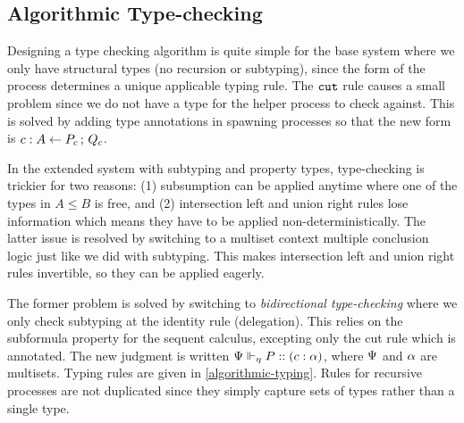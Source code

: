 \documentclass[submission,copyright,creativecommons]{eptcs}
\begin{document}
\subsection{Algorithmic Type-checking}

Designing a type checking algorithm is quite simple for the base system where we only have structural types (no recursion or subtyping), since the form of the process determines a unique applicable typing rule. The $\cut$ rule causes a small problem since we do not have a type for the helper process to check against. This is solved by adding type annotations in spawning processes so that the new form is $\tspawnType c {P_c} A {Q_c}$.

In the extended system with subtyping and property types, type-checking is trickier for two reasons: (1) subsumption can be applied anytime where one of the types in $A \le B$ is free, and (2) intersection left and union right rules lose information which means they have to be applied non-deterministically. The latter issue is resolved by switching to a multiset context multiple conclusion logic just like we did with subtyping. This makes intersection left and union right rules invertible, so they can be applied eagerly.

The former problem is solved by switching to \emph{bidirectional type-checking} where we only check subtyping at the identity rule (delegation). This relies on the subformula property for the sequent calculus, excepting only the cut rule which is annotated. The new judgment is written $\typeRecAJ P c \typeList$, where $\ctx$ and $\typeList$ are multisets. Typing rules are given in \cref{algorithmic-typing}. Rules for recursive processes are not duplicated since they simply capture sets of types rather than a single type.
\end{document}
